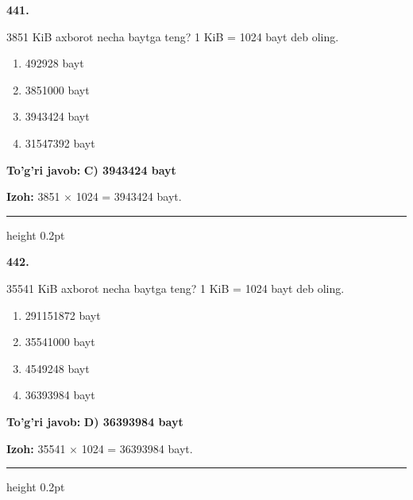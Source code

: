 \documentclass[10pt,a4paper,oneside]{article}
\begin{document}
\noindent\textbf{\color{ink}441.}
\par
3851 KiB axborot necha baytga teng? 1 KiB = 1024 bayt deb oling.
\begin{enumerate}[label=\Alph*),leftmargin=9mm]
\item 492928 bayt
\item 3851000 bayt
\item 3943424 bayt
\item 31547392 bayt
\end{enumerate}
\begin{tcolorbox}[enhanced,breakable,colback=teal!4,colframe=teal!50!black,boxrule=0.5pt,arc=1.1mm,left=3mm,right=3mm,top=1.7mm,bottom=1.7mm,before skip=2mm,after skip=2mm]
\textbf{\color{teal}To'g'ri javob:} \textbf{C) 3943424 bayt}
\par\smallskip
\textbf{Izoh:} 3851 \ensuremath{\times} 1024 = 3943424 bayt.
\end{tcolorbox}
\vspace{2mm}\hrule height 0.2pt \vspace{3mm}

\noindent\textbf{\color{ink}442.}
\par
35541 KiB axborot necha baytga teng? 1 KiB = 1024 bayt deb oling.
\begin{enumerate}[label=\Alph*),leftmargin=9mm]
\item 291151872 bayt
\item 35541000 bayt
\item 4549248 bayt
\item 36393984 bayt
\end{enumerate}
\begin{tcolorbox}[enhanced,breakable,colback=teal!4,colframe=teal!50!black,boxrule=0.5pt,arc=1.1mm,left=3mm,right=3mm,top=1.7mm,bottom=1.7mm,before skip=2mm,after skip=2mm]
\textbf{\color{teal}To'g'ri javob:} \textbf{D) 36393984 bayt}
\par\smallskip
\textbf{Izoh:} 35541 \ensuremath{\times} 1024 = 36393984 bayt.
\end{tcolorbox}
\vspace{2mm}\hrule height 0.2pt \vspace{3mm}
\end{document}
